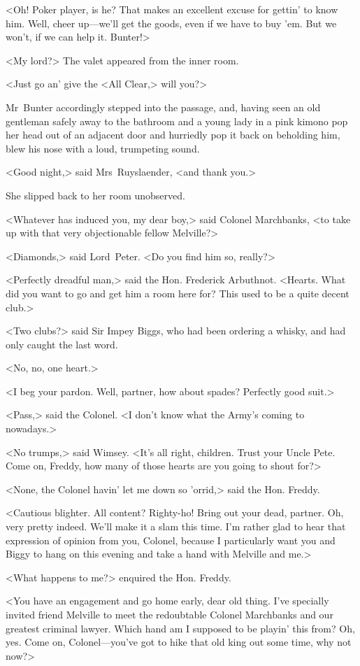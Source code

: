<Oh! Poker player, is he? That makes an excellent excuse for gettin' to know him. Well, cheer up—we'll get the goods, even if we have to buy 'em. But we won't, if we can help it. Bunter!>

<My lord?> The valet appeared from the inner room.

<Just go an' give the <All Clear,> will you?>

Mr~Bunter accordingly stepped into the passage, and, having seen an old gentleman safely away to the bathroom and a young lady in a pink kimono pop her head out of an adjacent door and hurriedly pop it back on beholding him, blew his nose with a loud, trumpeting sound.

<Good night,> said Mrs~Ruyslaender, <and thank you.>

She slipped back to her room unobserved.

<Whatever has induced you, my dear boy,> said Colonel Marchbanks, <to take up with that very objectionable fellow Melville?>

<Diamonds,> said Lord~Peter. <Do you find him so, really?>

<Perfectly dreadful man,> said the Hon. Frederick Arbuthnot. <Hearts. What did you want to go and get him a room here for? This used to be a quite decent club.>

<Two clubs?> said Sir Impey Biggs, who had been ordering a whisky, and had only caught the last word.

<No, no, one heart.>

<I beg your pardon. Well, partner, how about spades? Perfectly good suit.>

<Pass,> said the Colonel. <I don't know what the Army's coming to nowadays.>

<No trumps,> said Wimsey. <It's all right, children. Trust your Uncle Pete. Come on, Freddy, how many of those hearts are you going to shout for?>

<None, the Colonel havin' let me down so 'orrid,> said the Hon. Freddy.

<Cautious blighter. All content? Righty-ho! Bring out your dead, partner. Oh, very pretty indeed. We'll make it a slam this time. I'm rather glad to hear that expression of opinion from you, Colonel, because I particularly want you and Biggy to hang on this evening and take a hand with Melville and me.>

<What happens to me?> enquired the Hon. Freddy.

<You have an engagement and go home early, dear old thing. I've specially invited friend Melville to meet the redoubtable Colonel Marchbanks and our greatest criminal lawyer. Which hand am I supposed to be playin' this from? Oh, yes. Come on, Colonel—you've got to hike that old king out some time, why not now?>

